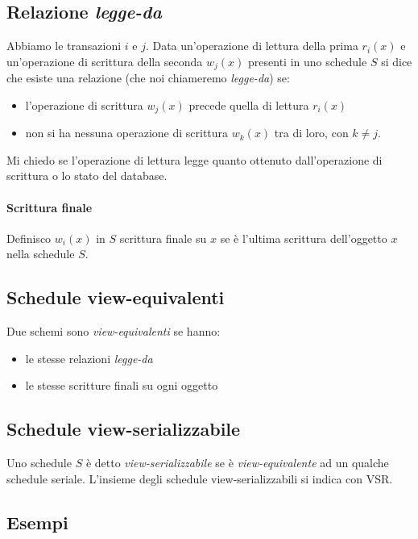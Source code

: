 \subsection{Relazione \emph{legge-da}}
Abbiamo le transazioni $i$ e $j$. Data un'operazione di lettura della prima $r_i(x)$ e un'operazione di scrittura della seconda  $w_j(x)$ presenti in uno schedule $S$ si dice che esiste una relazione (che noi chiameremo \emph{legge-da}) se:
\begin{itemize}
	\item l'operazione di scrittura $w_j(x)$ precede quella di lettura $r_i(x)$
	\item non si ha nessuna operazione di scrittura $w_k(x)$ tra di loro, con $k \neq j$.
\end{itemize}
Mi chiedo se l'operazione di lettura legge quanto ottenuto dall'operazione di scrittura o lo stato del database.
\paragraph{Scrittura finale} Definisco $w_i(x)$ in $S$ scrittura finale su $x$ se è l'ultima scrittura dell'oggetto $x$ nella schedule $S$.
\subsection{Schedule view-equivalenti} Due schemi sono \emph{view-equivalenti} se hanno:
\begin{itemize}
	\item le stesse relazioni \emph{legge-da} 
	\item le stesse scritture finali su ogni oggetto
\end{itemize}
\subsection{Schedule view-serializzabile} Uno schedule $S$ è detto \emph{view-serializzabile} se è \emph{view-equivalente} ad un qualche schedule seriale. L'insieme degli schedule view-serializzabili si indica con VSR. 

\subsection{Esempi}
